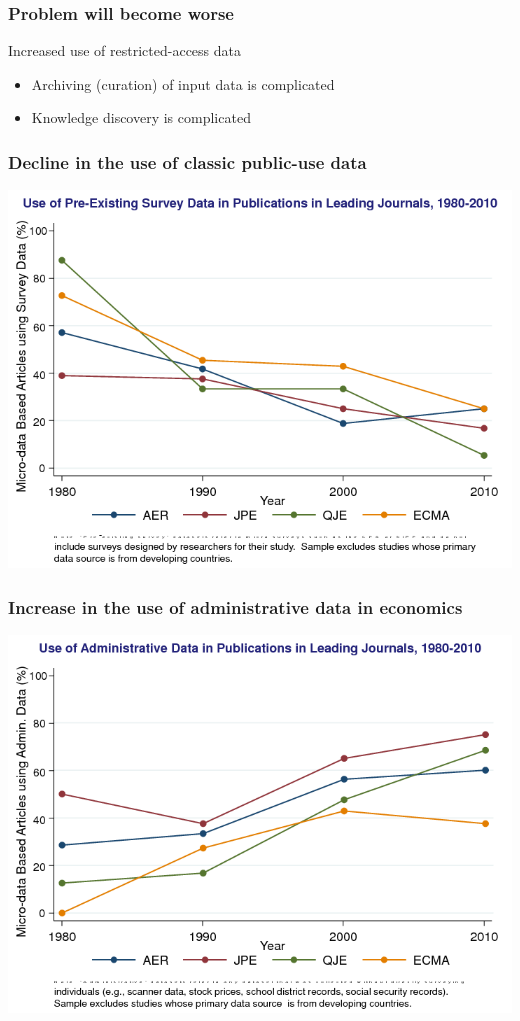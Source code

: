 \begin{frame}
	\frametitle{Problem will become worse}
	\begin{block}{Increased use of restricted-access data}
\begin{itemize}
			\item Archiving (curation) of input data is complicated
			\item Knowledge discovery is complicated
		\end{itemize}
	\end{block}
\end{frame}
\begin{frame}
	\frametitle{Decline in the use of classic public-use data}
	\centering
	\includegraphics[width=0.7\paperwidth]{ChettySlide1}
\end{frame}

\begin{frame}
	\frametitle{Increase in the use of administrative data in economics}
	\centering
	\includegraphics[width=0.7\paperwidth]{ChettySlide2}
\end{frame}


